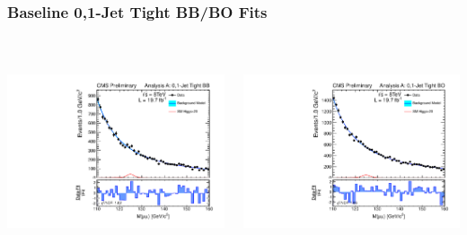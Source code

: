 \documentclass{beamer}
\begin{document}
\begin{frame}
\frametitle{Baseline 0,1-Jet Tight BB/BO Fits}
  \vspace{-1em}
  \begin{columns}[c]
   \column{60mm}
      \begin{center}
        \includegraphics[height=60mm]{plotsPublic/mass_AnanlysisA/pdf/CombSplitAll_8TeV_125_Jets01PassPtG10BB.pdf}
      \end{center}
   \column{60mm}
      \begin{center}
        \includegraphics[height=60mm]{plotsPublic/mass_AnanlysisA/pdf/CombSplitAll_8TeV_125_Jets01PassPtG10BO.pdf}
      \end{center}
  \end{columns}
\begin{center}
\end{center}
\end{frame}
\end{document}

